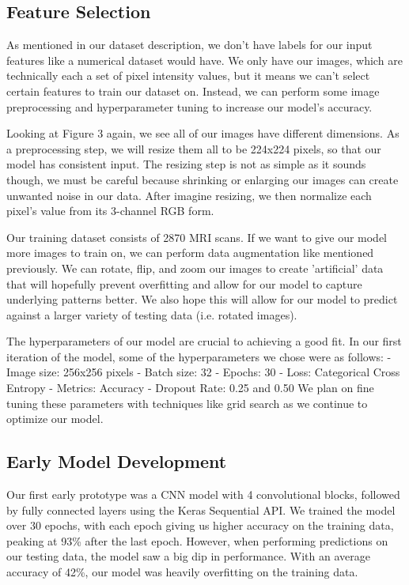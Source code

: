 \documentclass[conference]{IEEEtran}
\begin{document}
\subsection{\large Feature Selection}
As mentioned in our dataset description, we don't have labels for our input features like a numerical dataset would have. We only have our images, which are technically each a set of pixel intensity values, but it means we can't select certain features to train our dataset on. Instead, we can perform some image preprocessing and hyperparameter tuning to increase our model's accuracy.

Looking at Figure 3 again, we see all of our images have different dimensions. As a preprocessing step, we will resize them all to be 224x224 pixels, so that our model has consistent input.  The resizing step is not as simple as it sounds though, we must be careful because shrinking or enlarging our images can create unwanted noise in our data. After imagine resizing, we then normalize each pixel's value from its 3-channel RGB form.

Our training dataset consists of 2870 MRI scans. If we want to give our model more images to train on, we can perform data augmentation like mentioned previously. We can rotate, flip, and zoom our images to create 'artificial' data that will hopefully prevent overfitting and allow for our model to capture underlying patterns better. We also hope this will allow for our model to predict against a larger variety of testing data (i.e. rotated images). 

The hyperparameters of our model are crucial to achieving a good fit. In our first iteration of the model, some of the hyperparameters we chose were as follows:
- Image size: 256x256 pixels		- Batch size: 32		- Epochs: 30	
- Loss:  Categorical Cross Entropy 	- Metrics: Accuracy		- Dropout Rate: 0.25 and 0.50
We plan on fine tuning these parameters with techniques like grid search as we continue to optimize our model. 

\subsection{\large Early Model Development}

Our first early prototype was a CNN model with 4 convolutional blocks, followed by fully connected layers using the Keras Sequential API. We trained the model over 30 epochs, with each epoch giving us higher accuracy on the training data, peaking at 93\% after the last epoch. However, when performing predictions on our testing data, the model saw a big dip in performance. With an average accuracy of 42\%, our model was heavily overfitting on the training data.
\end{document}
